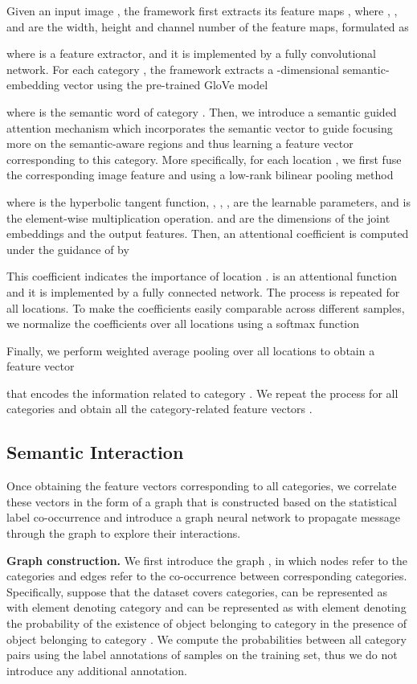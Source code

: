 \documentclass[10pt,twocolumn,letterpaper]{article}
\begin{document}
Given an input image , the framework first extracts its feature maps , where , , and  are the width, height and channel number of the feature maps, formulated as

where  is a feature extractor, and it is implemented by a fully convolutional network. For each category , the framework extracts a -dimensional semantic-embedding vector using the pre-trained GloVe \cite{pennington2014glove} model

where  is the semantic word of category . Then, we introduce a semantic guided attention mechanism which incorporates the semantic vector  to guide focusing more on the semantic-aware regions and thus learning a feature vector corresponding to this category. More specifically, for each location , we first fuse the corresponding image feature  and  using a low-rank bilinear pooling method \cite{kim2016hadamard}

where  is the hyperbolic tangent function, , , ,  are the learnable parameters, and  is the element-wise multiplication operation.  and  are the dimensions of the joint embeddings and the output features. Then, an attentional coefficient is computed under the guidance of  by

This coefficient indicates the importance of location .  is an attentional function and it is implemented by a fully connected network. The process is repeated for all locations. To make the coefficients easily comparable across different samples, we normalize the coefficients over all locations using a softmax function

Finally, we perform weighted average pooling over all locations to obtain a feature vector

that encodes the information related to category . We repeat the process for all categories and obtain all the category-related feature vectors .

\subsection{Semantic Interaction}
\label{sec:SI}
Once obtaining the feature vectors corresponding to all categories, we correlate these vectors in the form of a graph that is constructed based on the statistical label co-occurrence and introduce a graph neural network to propagate message through the graph to explore their interactions.

\noindent\textbf{Graph construction.} We first introduce the graph , in which nodes refer to the categories and edges refer to the co-occurrence between corresponding categories. Specifically, suppose that the dataset covers  categories,  can be represented as  with element  denoting category  and  can be represented as  with element  denoting the probability of the existence of object belonging to category  in the presence of object belonging to category . We compute the probabilities between all category pairs using the label annotations of samples on the training set, thus we do not introduce any additional annotation.
\end{document}
